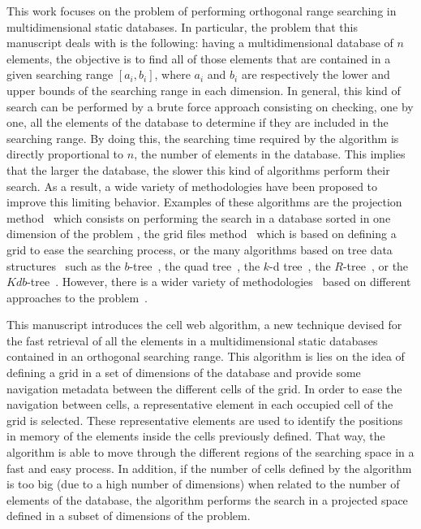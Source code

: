 \documentclass[review]{elsarticle}
\begin{document}
This work focuses on the problem of performing orthogonal range searching in multidimensional static databases. In particular, the problem that this manuscript deals with is the following: having a multidimensional database of $n$ elements, the objective is to find all of those elements that are contained in a given searching range $[a_i,b_i]$, where $a_i$ and $b_i$ are respectively the lower and upper bounds of the searching range in each dimension. In general, this kind of search can be performed by a brute force approach consisting on checking, one by one, all the elements of the database to determine if they are included in the searching range. By doing this, the searching time required by the algorithm is directly proportional to $n$, the number of elements in the database. This implies that the larger the database, the slower this kind of algorithms perform their search. As a result, a wide variety of methodologies have been proposed to improve this limiting behavior. Examples of these algorithms are the projection method~\cite{basic} which consists on performing the search in a database sorted in one dimension of the problem , the grid files method~\cite{grid} which is based on defining a grid to ease the searching process, or the many algorithms based on tree data structures~\cite{making,barnes,olson} such as the $b$-tree~\cite{btree}, the quad tree~\cite{quadtree}, the $k$-d tree~\cite{Bentley}, the $R$-tree~\cite{rtrees}, or the $Kdb$-tree~\cite{kdbtree}. However, there is a wider variety of methodologies~\cite{willard,lueker,alstrup,arya,ndkv} based on different approaches to the problem~\cite{agarwal,Chazelle}.

This manuscript introduces the cell web algorithm, a new technique devised for the fast retrieval of all the elements in a multidimensional static databases contained in an orthogonal searching range. This algorithm is lies on the idea of defining a grid in a set of dimensions of the database and provide some navigation metadata between the different cells of the grid. In order to ease the navigation between cells, a representative element in each occupied cell of the grid is selected. These representative elements are used to identify the positions in memory of the elements inside the cells previously defined. That way, the algorithm is able to move through the different regions of the searching space in a fast and easy process. In addition, if the number of cells defined by the algorithm is too big (due to a high number of dimensions) when related to the number of elements of the database, the algorithm performs the search in a projected space defined in a subset of dimensions of the problem.
\end{document}
